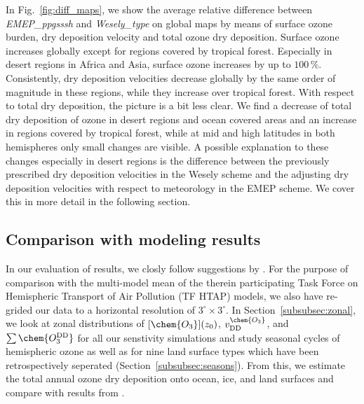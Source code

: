 \documentclass[gmd, manuscript]{copernicus}
\begin{document}
In Fig.~\ref{fig:diff_maps}, we show the average relative difference between \emph{EMEP\_ppgsssh} and \emph{Wesely\_type} on global maps by means of surface ozone burden, dry deposition velocity and total ozone dry deposition. Surface ozone increases globally except for regions covered by tropical forest. Especially in desert regions in Africa and Asia, surface ozone increases by up to $100\,\unit{\%}$. Consistently, dry deposition velocities decrease globally by the same order of magnitude in these regions, while they increase over tropical forest. With respect to total dry deposition, the picture is a bit less clear. We find a decrease of total dry deposition of ozone in desert regions and ocean covered areas and an increase in regions covered by tropical forest, while at mid and high latitudes in both hemispheres only small changes are visible. A possible explanation to these changes especially in desert regions is the difference between the previously prescribed dry deposition velocities in the Wesely scheme and the adjusting dry deposition velocities with respect to meteorology in the EMEP scheme. We cover this in more detail in the following section.

\subsection{Comparison with modeling results}
\label{subsec:model}
%
In our evaluation of results, we closly follow suggestions by \citet{ACP:Hardacre2015}. For the purpose of comparison with the multi-model mean of the therein participating Task Force on Hemispheric Transport of Air Pollution (TF HTAP) models, we also have re-grided our data to a horizontal resolution of $3^\circ\times 3^\circ$. In Section~\ref{subsubsec:zonal}, we look at zonal distributions of $[\chem{O_3}](z_0)$, $v^\chem{O_3}_\text{DD}$, and $\sum\chem{O_3^\text{DD}}$ for all our senstivity simulations and study seasonal cycles of hemispheric ozone as well as for nine land surface types which have been retrospectively seperated (Section~\ref{subsubsec:seasons}). From this, we estimate the total annual ozone dry deposition onto ocean, ice, and land surfaces and compare with results from \citet{ACP:Luhar2017}.
%
\end{document}
